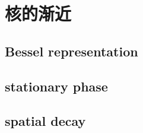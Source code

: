 \section{核的渐近}
\label{b2:sec:2402}


\subsection{Bessel representation}
\label{b2:subsec:240201}

\subsection{stationary phase}
\label{b2:subsec:240202}

\subsection{spatial decay}
\label{b2:subsec:240203}


